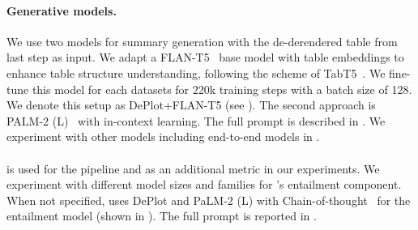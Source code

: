 \paragraph{Generative models.}
We use two models for summary generation with the de-derendered table from last step as input.
We adapt a FLAN-T5~\cite{suresh2023semantic} base model with table embeddings to enhance table structure understanding, following the scheme of TabT5~\cite{andrejczuk-etal-2022-table}.  We fine-tune this model for each datasets for 220k training steps with a batch size of 128. We denote this setup as DePlot+FLAN-T5 (see ). 
The second approach is PALM-2 (L)~\cite{anil2023palm} with in-context learning. The full prompt is described in . %
We experiment with other models including end-to-end models in .


\paragraph{\metric{}} is used for the \pipeline{} pipeline and as an additional metric in our experiments.
We experiment with different model sizes and families for \metric{}'s entailment component. 
When not specified, \metric{} uses DePlot and PaLM-2 (L) with Chain-of-thought~\citep{wei2022chain} for the entailment model (shown in ).
The full prompt is reported in .

